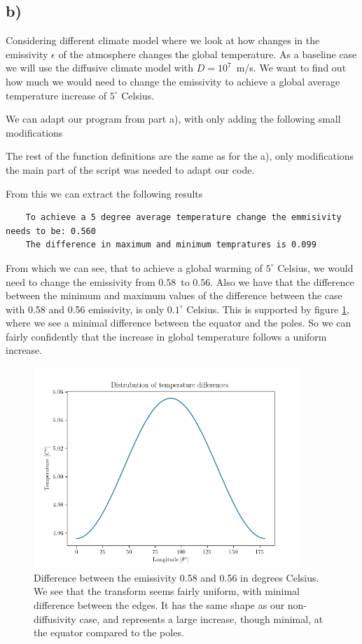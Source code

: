 \documentclass[10pt, a4paper]{amsart}
\begin{document}
\subsection{b)}
Considering different climate model where we look at how changes in the emissivity $\epsilon$ of the atmosphere changes the global temperature. As a baseline case we will use the diffusive climate model with $D = 10^7$ m/s. We want to find out how much we would need to change the emissivity to achieve a global average temperature increase of $5^\circ$ Celsius. 

We can adapt our program from part a), with only adding the following small modifications 


The rest of the function definitions are the same as for the a), only modifications the main part of the script was needed to adapt our code. 

From this we can extract the following results
\begin{lstlisting}
	To achieve a 5 degree average temperature change the emmisivity needs to be: 0.560
	The difference in maximum and minimum tempratures is 0.099
\end{lstlisting}
From which we can see, that to achieve a global warming of $5^\circ$ Celsius, we would need to change the emissivity from $0.58$ to $0.56$. Also we have that the difference between the minimum and maximum values of the difference between the case with 0.58 and 0.56 emissivity, is only $0.1^\circ$ Celsius. This is supported by figure \ref{fig:1b}, where we see a minimal difference between the equator and the poles. So we can fairly confidently that the increase in global temperature follows a uniform increase.
\begin{figure}
	\centering\includegraphics[width=0.9\textwidth]{../code/1b.png}
	\caption{Difference between the emissivity 0.58 and 0.56 in degrees Celsius. We see that the transform seems fairly uniform, with minimal difference between the edges. It has the same shape as our non-diffusivity case, and represents a large increase, though minimal, at the equator compared to the poles.}
	\label{fig:1b}
\end{figure}
\end{document}
